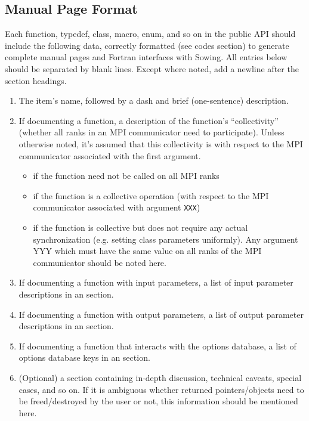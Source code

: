\subsection*{Manual Page Format}
\label{sec:manpageformat}
Each function, typedef, class, macro, enum, and so on in the public API should include the following data, correctly formatted
(see codes section) to generate complete manual pages and Fortran interfaces with Sowing.
All entries below should be separated by blank lines. Except where noted, add a newline after the section headings.
\begin{enumerate}
  \item The item's name, followed by a dash and brief (one-sentence) description.
  \item If documenting a function, a description of the function's ``collectivity''
    (whether all ranks in an MPI communicator need to participate). Unless otherwise noted,
    it's assumed that this collectivity is with respect to the MPI communicator associated with the first argument.
    \begin{itemize}
    \item {} if the function need not be called on all MPI ranks
    \item {} if the function is a collective operation
      (with respect to the MPI communicator associated with argument \lstinline{XXX})
    \item {} if
      the function is collective but does not require any actual synchronization
      (e.g. setting class parameters uniformly). Any argument YYY which must have the
        same value on all ranks of the MPI communicator should be noted here.
    \end{itemize}
  \item If documenting a function with input parameters, a list of input parameter descriptions in an  section.
  \item If documenting a function with output parameters, a list of output parameter descriptions in an  section.
  \item If documenting a function that interacts with the options database, a list of options database keys in an  section.
  \item (Optional) a  section containing in-depth discussion, technical caveats, special cases, and so on.
    If it is ambiguous whether returned pointers/objects need to be freed/destroyed by the user or not, this information should be mentioned here.

\end{enumerate}
